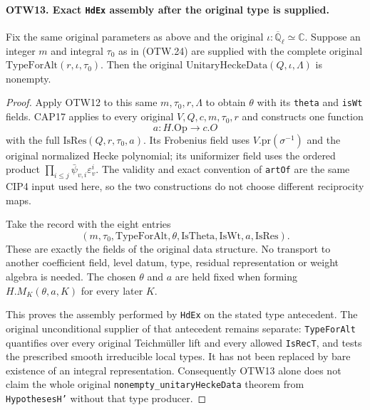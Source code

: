 \paragraph{OTW13. Exact \texttt{HdEx} assembly after the original type is supplied.}
\label{claim:OTW13}
Fix the same original parameters as above and the original
$\iota:\overline{\mathbb Q}_\ell\simeq\mathbb C$.
Suppose an integer $m$ and integral $\tau_0$ as in (OTW.24)
are supplied with the complete original
$\mathrm{TypeForAlt}(r,\iota,\tau_0)$.  Then the original
$\mathrm{UnitaryHeckeData}(Q,\iota,\Lambda)$ is nonempty.
\begin{proof}
Apply OTW12 to this same $m,\tau_0,r,\Lambda$ to obtain
$\theta$ with its \texttt{theta} and \texttt{isWt} fields.
CAP17 applies to every original $V,Q,c,m,\tau_0,r$ and constructs
one function
\[
                      a:H.\mathrm{Op}\longrightarrow c.O
                      \tag{OTW.35}
\]
with the full $\mathrm{IsRes}(Q,r,\tau_0,a)$.
Its Frobenius field uses $V.\mathrm{pr}(\sigma^{-1})$ and the
original normalized Hecke polynomial; its uniformizer field uses
the ordered product $\prod_{i\leq j}\bar\psi_{v,i}\varepsilon_v^i$.
The validity and exact convention of \texttt{artOf} are the same
CIP4 input used here, so the two constructions do not choose
different reciprocity maps.

Take the record with the eight entries
\[
        (m,\tau_0,\mathrm{TypeForAlt},\theta,
                       \mathrm{IsTheta},\mathrm{IsWt},a,\mathrm{IsRes}).
        \tag{OTW.36}
\]
These are exactly the fields of the original data structure.
No transport to another coefficient field, level datum, type,
residual representation or weight algebra is needed.
The chosen $\theta$ and $a$ are held fixed when forming
$H.M_K(\theta,a,K)$ for every later $K$.

This proves the assembly performed by \texttt{HdEx} on the
stated type antecedent.  The original unconditional supplier of
that antecedent remains separate: \texttt{TypeForAlt} quantifies
over every original Teichm\"uller lift and every allowed
\texttt{IsRecT}, and tests the prescribed smooth irreducible
local types.  It has not been replaced by bare existence of an
integral representation.  Consequently OTW13 alone does not claim
the whole original \texttt{nonempty\_unitaryHeckeData} theorem
from \texttt{HypothesesH'} without that type producer.
\end{proof}

